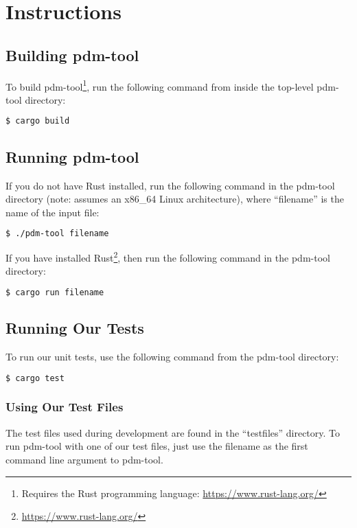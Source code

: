 \chapter{Instructions}

\section{Building pdm-tool}

To build pdm-tool\footnote{Requires the Rust programming language:
\url{https://www.rust-lang.org/}}, run the following command from inside the
top-level pdm-tool directory:

\begin{lstlisting}[language=bash,frame=single,showstringspaces=false]
$ cargo build
\end{lstlisting}

\section{Running pdm-tool}

If you do not have Rust installed, run the following command in the
pdm-tool directory (note: assumes an x86\_64 Linux architecture), where
``filename'' is the name of the input file:

\begin{lstlisting}[language=bash,frame=single,showstringspaces=false]
$ ./pdm-tool filename
\end{lstlisting}

If you have installed Rust\footnote{\url{https://www.rust-lang.org/}},
then run the following command in the pdm-tool directory:

\begin{lstlisting}[language=bash,frame=single,showstringspaces=false]
$ cargo run filename
\end{lstlisting}

\section{Running Our Tests}

To run our unit tests, use the following command from the pdm-tool
directory:

\begin{lstlisting}[language=bash,frame=single,showstringspaces=false]
$ cargo test
\end{lstlisting}

\subsection{Using Our Test Files}

The test files used during development are found in the ``testfiles''
directory. To run pdm-tool with one of our test files, just use the
filename as the first command line argument to pdm-tool.
